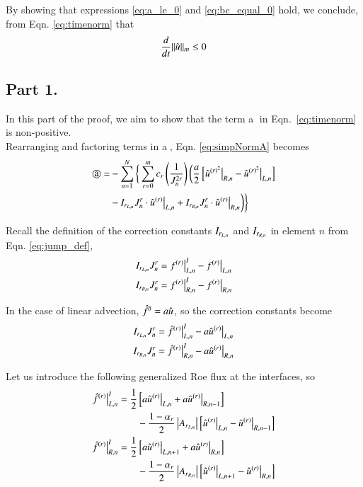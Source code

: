 By showing that expressions \eqref{eq:a_le_0} and \eqref{eq:bc_equal_0} hold, we conclude, from Eqn. \eqref{eq:timenorm} that
\begin{equation}
\DD{}{t}||\urd||_m \le 0
\end{equation}

\subsection{Part 1.}

In this part of the proof, we aim to show that the term \textcircled{a} in
Eqn.~\eqref{eq:timenorm} is non-positive.
\\
Rearranging and factoring terms in \textcircled{a}, Eqn. \eqref{eq:simpNormA} becomes
\begin{equation}
\begin{split}
\text{\textcircled{a}} =& -\sum_{n=1}^{N}  \bigg\{
 \sum^m_{r=0} c_r \l( \frac{1}{J_n^{2r}}\r)
 \bigg( \frac{a}{2} 
 \l[ \hat{u}^{{(r)}^2} \big|_{R,n} - \hat{u}^{{ (r)}^2} \big|_{L,n} \r]\\
 &- \IL[r] J_n^r\cdot \dD{\urd}{r} \big|_{L,n}
 +   \IR[r] J_n^r\cdot \dD{\urd}{r} \big|_{R,n}  \bigg)
 \bigg\}
 \end{split}
 \label{eq:aterm}
\end{equation}

Recall the definition of the correction constants $\IL[r] $ and
$\IR[r]$ in element $n$ from Eqn. \eqref{eq:jump_def},
\begin{equation}
\begin{split}
 \IL[r]J_n^r &= \dD{f}{r} \big|^I_{L,n} - {f}^{ (r)} \big|_{L,n}\\
 \IR[r]J_n^r &= \dD{f}{r} \big|^I_{R,n} - {f}^{ (r)} \big|_{R,n}
\end{split}
\end{equation}

In the case of linear advection, $\hat{f}^\delta = a\urd$, so the correction constants become
\begin{equation}
\label{eq:lincor}
\begin{split}
 \IL[r]J_n^r &= \dD{\hat{f}}{r} \big|^I_{L,n} - a\urdrL\\
 \IR[r]J_n^r &= \dD{\hat{f}}{r} \big|^I_{R,n} - a\urdrR
\end{split}
\end{equation}

Let us introduce the following generalized Roe flux at the interfaces, so
\begin{equation}
\label{eq:ifluxdef}
\begin{split}
\dD{\hat{f}}{r} \big|^I_{L,n} = \frac{1}{2}& \l[a\urdrL[n] + 
a\urdrR[n-1] \r] \\
&- \frac{1-{\alpha_r}}{2} \l|A_{r_{L,n}}\r| \l[\urdrL - \urdrR[n-1] \r]\\
\dD{\hat{f}}{r} \big|^I_{R,n} = \frac{1}{2}& \l[a\urdrL[n+1] + 
a\urdrR[n] \r]\\
&- \frac{1-{\alpha_r}}{2} \l|A_{r_{R,n}}\r| \l[\urdrL[n+1] - \urdrR[n] \r]
\end{split}
\end{equation}

